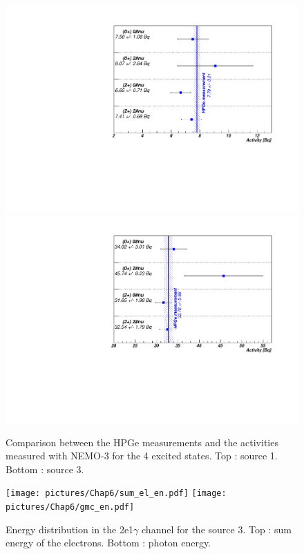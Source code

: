 \documentclass[main.tex]{subfiles}
\begin{document}
\begin{figure} [h!]
\begin{center}
\includegraphics[scale=0.6]{pictures/Chap6/ComparisonChannelSource1AllES.pdf}
\includegraphics[scale=0.6]{pictures/Chap6/ComparisonChannelSource3AllES.pdf}
\end{center}
\caption{Comparison between the HPGe measurements and the activities measured with NEMO-3 for the 4 excited states. Top : source 1. Bottom : source 3.}
\label{plot:ComparisionSourcesHPGe}
\end{figure}



\begin{figure} [h!]
\begin{center}
\texttt{[image: pictures/Chap6/sum\_el\_en.pdf]}
\texttt{[image: pictures/Chap6/gmc\_en.pdf]}
\end{center}
\caption{Energy distribution in the 2e1$\gamma$ channel for the source 3. Top : sum energy of the electrons. Bottom : photon energy.}
\label{plot:DistributionEnergy2nu2Systematics}
\end{figure}
\end{document}
